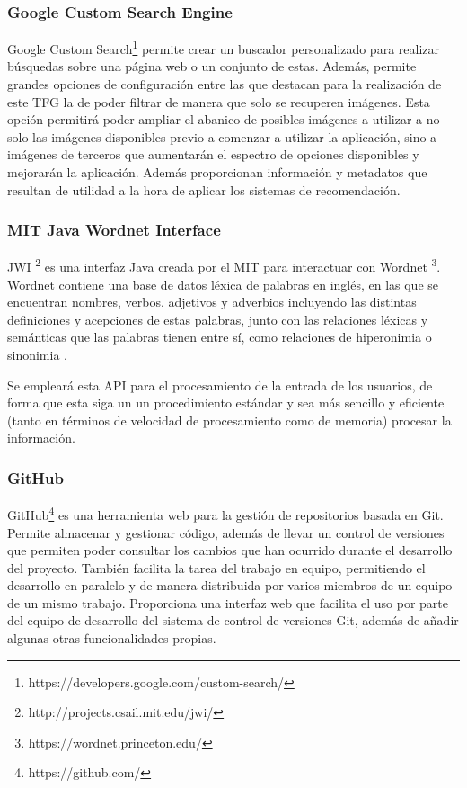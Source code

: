 \subsubsection{Google Custom Search Engine}

Google Custom Search\footnote{https://developers.google.com/custom-search/} permite crear un buscador personalizado para realizar búsquedas sobre una página web o un conjunto de estas. Además, permite grandes opciones de configuración entre las que destacan para la realización de este \ac{TFG} la de poder filtrar de manera que solo se recuperen imágenes. Esta opción permitirá poder ampliar el abanico de posibles imágenes a utilizar a no solo las imágenes disponibles previo a comenzar a utilizar la aplicación, sino a imágenes de terceros que aumentarán el espectro de opciones disponibles y mejorarán la aplicación. Además proporcionan información y metadatos que resultan de utilidad a la hora de aplicar los sistemas de recomendación.

\subsubsection{MIT Java Wordnet Interface}

\ac{JWI} \footnote{http://projects.csail.mit.edu/jwi/} es una interfaz Java creada por el \ac{MIT} para interactuar con Wordnet \footnote{https://wordnet.princeton.edu/}. Wordnet contiene una base de datos léxica de palabras en inglés, en las que se encuentran nombres, verbos, adjetivos y adverbios incluyendo las distintas definiciones y acepciones de estas palabras, junto con las relaciones léxicas y semánticas que las palabras tienen entre sí, como relaciones de hiperonimia o sinonimia \cite{finlayson2014java}.

Se empleará esta \acs{API} para el procesamiento de la entrada de los usuarios, de forma que esta siga un un procedimiento estándar y sea más sencillo y eficiente (tanto en términos de velocidad de procesamiento como de memoria) procesar la información.


\subsubsection{GitHub}

GitHub\footnote{https://github.com/} es una herramienta web para la gestión de repositorios  basada en Git. Permite almacenar y gestionar código, además de llevar un control de versiones que permiten poder consultar los cambios que han ocurrido durante el desarrollo del proyecto. También facilita la tarea del trabajo en equipo, permitiendo el desarrollo en paralelo y de manera distribuida por varios miembros de un equipo de un mismo trabajo. Proporciona una interfaz web que facilita el uso por parte del equipo de desarrollo del sistema de control de versiones Git, además de añadir algunas otras funcionalidades propias.

